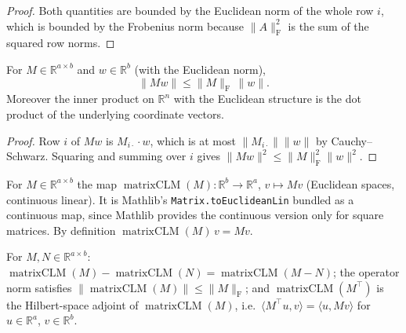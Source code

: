 \begin{proof}
  \leanok
Both quantities are bounded by the Euclidean norm of the whole row $i$, which is bounded by
the Frobenius norm because $\|A\|_{\mathrm F}^2$ is the sum of the squared row norms.
\end{proof}

\begin{lemma}\label{lem:ntkf:mulVec}
  \leanok
For $M\in\mathbb R^{a\times b}$ and $w\in\mathbb R^b$ (with the Euclidean norm),
\[
  \|Mw\|\le\|M\|_{\mathrm F}\,\|w\| .
\]
Moreover the inner product on $\mathbb R^n$ with the Euclidean structure is the dot product of
the underlying coordinate vectors.
\end{lemma}

\begin{proof}
  \leanok
Row $i$ of $Mw$ is $M_{i\cdot}\cdot w$, which is at most $\|M_{i\cdot}\|\|w\|$ by
Cauchy--Schwarz. Squaring and summing over $i$ gives $\|Mw\|^2\le\|M\|_{\mathrm F}^2\|w\|^2$.
\end{proof}

\begin{definition}\label{def:ntkf:matrixCLM}
  \leanok
For $M\in\mathbb R^{a\times b}$ the map $\operatorname{matrixCLM}(M):\mathbb R^b\to\mathbb R^a$,
$v\mapsto Mv$ (Euclidean spaces, continuous linear). It is Mathlib's
\texttt{Matrix.toEuclideanLin} bundled as a continuous map, since Mathlib provides the
continuous version only for square matrices. By definition
$\operatorname{matrixCLM}(M)\,v=Mv$.
\end{definition}

\begin{lemma}\label{lem:ntkf:matrixCLM}
  \leanok
For $M,N\in\mathbb R^{a\times b}$:
$\operatorname{matrixCLM}(M)-\operatorname{matrixCLM}(N)=\operatorname{matrixCLM}(M-N)$;
the operator norm satisfies $\|\operatorname{matrixCLM}(M)\|\le\|M\|_{\mathrm F}$; and
$\operatorname{matrixCLM}(M^\top)$ is the Hilbert-space adjoint of $\operatorname{matrixCLM}(M)$, i.e.\
$\langle M^\top u,v\rangle=\langle u,Mv\rangle$ for $u\in\mathbb R^a$, $v\in\mathbb R^b$.
\end{lemma}


